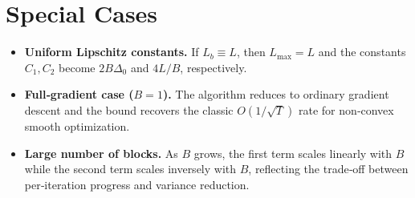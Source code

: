 \documentclass[11pt]{article}
\begin{document}
\section*{Special Cases}
\begin{itemize}
\item \textbf{Uniform Lipschitz constants.} If $L_b\equiv L$, then $L_{\max}=L$ and the constants $C_1,C_2$ become $2B\Delta_0$ and $4L/B$, respectively.
\item \textbf{Full‑gradient case ($B=1$).} The algorithm reduces to ordinary gradient descent and the bound recovers the classic $O(1/\sqrt{T})$ rate for non‑convex smooth optimization.
\item \textbf{Large number of blocks.} As $B$ grows, the first term scales linearly with $B$ while the second term scales inversely with $B$, reflecting the trade‑off between per‑iteration progress and variance reduction.
\end{itemize}
\end{document}
